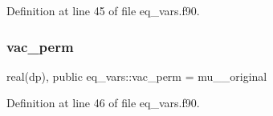 Definition at line 45 of file eq\+\_\+vars.\+f90.

\mbox{\label{namespaceeq__vars_ac45a3781896236d8c8fe95d920f7337c}} 
\subsubsection{\texorpdfstring{vac\+\_\+perm}{vac\_perm}}
{\footnotesize\ttfamily real(dp), public eq\+\_\+vars\+::vac\+\_\+perm = mu\+\_\+\_\+original}



Definition at line 46 of file eq\+\_\+vars.\+f90.

